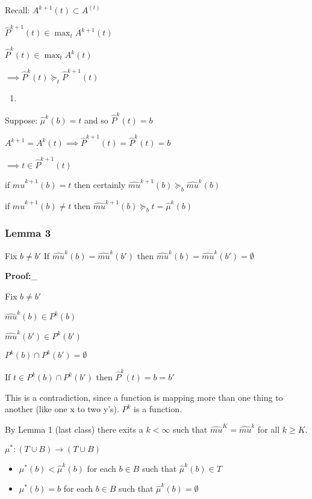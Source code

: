 \documentclass[11pt]{article}
\providecommand{\tightlist}{%
      \setlength{\itemsep}{0pt}\setlength{\parskip}{0pt}}
\begin{document}
Recall: \(A^{k+1}(t) \subset A^(t)\)

\(\hat{P}^{k+1}(t) \in \max_t A^{k+1}(t)\)

\(\hat{P}^{k}(t) \in \max_t A^{k}(t)\)

\(\implies \hat{P}^{k}(t) \succeq_t \hat{P}^{k+1}(t)\)

    \begin{enumerate}
\def\labelenumi{(\arabic{enumi})}
\setcounter{enumi}{1}
\item
\end{enumerate}

Suppose: \(\hat{\mu}^k(b) = t\) and so \(\hat{P}^{k}(t)=b\)

\(A^{k+1} = A^k(t) \implies \hat{P}^{k+1}(t) = \hat{P}^{k}(t) = b\)

\(\implies t \in \hat{P}^{k+1}(t)\)

if \(\hat{mu}^{k+1}(b) = t\) then certainly
\(\hat{mu}^{k+1}(b) \succeq_b \hat{mu}^{k}(b)\)

if \(\hat{mu}^{k+1}(b) \ne t\) then
\(\hat{mu}^{k+1}(b) \succeq_b t = \hat{\mu}^k(b)\)

    \subsubsection{Lemma 3}\label{lemma-3}

Fix \(b \ne b'\) If \(\hat{mu}^{k}(b) = \hat{mu}^{k}(b')\) then
\(\hat{mu}^{k}(b) = \hat{mu}^{k}(b') = \emptyset\)

\textbf{Proof:}\_

Fix \(b \ne b'\)

\(\hat{mu}^{k}(b) \in P^k(b)\)

\(\hat{mu}^{k}(b') \in P^k(b')\)

\(P^k(b) \cap P^k(b') = \emptyset\)

If \(t \in P^k(b) \cap P^k(b')\) then \(\hat{P}^k(t) = b = b'\)

This is a contradiction, since a function is mapping more than one thing
to another (like one x to two y's). \(P^k\) is a function.

    By Lemma 1 (last class) there exits a \(k < \infty\) such that
\(\hat{mu}^{K} = \hat{mu}^{k}\) for all \(k \ge K\).

\(\mu^*: (T \cup B) \rightarrow (T \cup B)\)

\begin{itemize}
\tightlist
\item
  \(\mu^*(b) < \hat{\mu}^k(b)\) for each \(b \in B\) such that
  \(\hat{\mu}^k(b) \in T\)
\item
  \(\mu^*(b) = b\) for each \(b \in B\) such that
  \(\hat{\mu}^k(b) = \emptyset\)
\end{itemize}
\end{document}
